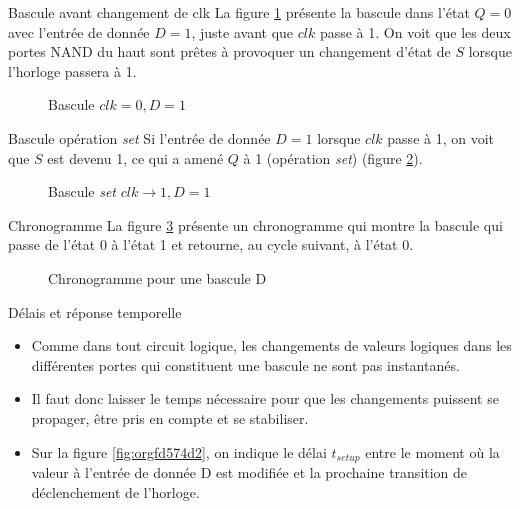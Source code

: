 \documentclass[presentation]{beamer}
\begin{document}
\begin{frame}[label={sec:org10f7777}]{Bascule avant changement de clk}
La figure \ref{fig:org2109fb2} présente la bascule dans l'état \(Q=0\)
avec l'entrée de donnée \(D = 1\), juste avant que \(clk\) passe
à 1. On voit que les deux portes NAND du haut sont prêtes à provoquer
un changement d'état de \(S\) lorsque l'horloge passera à 1.

\begin{figure}[htbp]
\centering

\caption{\label{fig:org2109fb2}Bascule   \(clk =0, D = 1\)}
\end{figure}
\end{frame}

\begin{frame}[label={sec:org0926976}]{Bascule opération \emph{set}}
Si l'entrée de donnée \(D = 1\) lorsque \(clk\) passe à 1, on voit
que \(S\) est devenu 1, ce qui a amené \(Q\) à 1 (opération \emph{set})
(figure \ref{fig:org6b80a48}).

\begin{figure}[htbp]
\centering

\caption{\label{fig:org6b80a48}Bascule  \emph{set} \(clk \rightarrow 1, D=1\)}
\end{figure}
\end{frame}

\begin{frame}[label={sec:orgb0ecf95}]{Chronogramme}
La figure \ref{fig:orgde3ea2f} présente un chronogramme qui montre la bascule
qui passe de l'état 0 à l'état 1 et retourne, au cycle suivant, à
l'état 0.

\begin{figure}[htbp]
\centering

\caption{\label{fig:orgde3ea2f}Chronogramme pour une bascule D}
\end{figure}
\end{frame}

\begin{frame}[label={sec:org49771ea}]{Délais et réponse temporelle}
\begin{itemize}
\item Comme dans tout circuit logique, les changements de valeurs logiques dans les différentes portes qui constituent une bascule ne sont pas instantanés.

\item Il faut donc laisser le temps nécessaire pour que les changements puissent se propager, être pris en compte et se stabiliser.

\item Sur la figure \ref{fig:orgfd574d2}, on indique le délai \(t_{setup}\) entre le moment où la valeur à l'entrée de donnée D est modifiée et la prochaine transition de déclenchement de l'horloge.
\end{itemize}
\end{frame}
\end{document}
